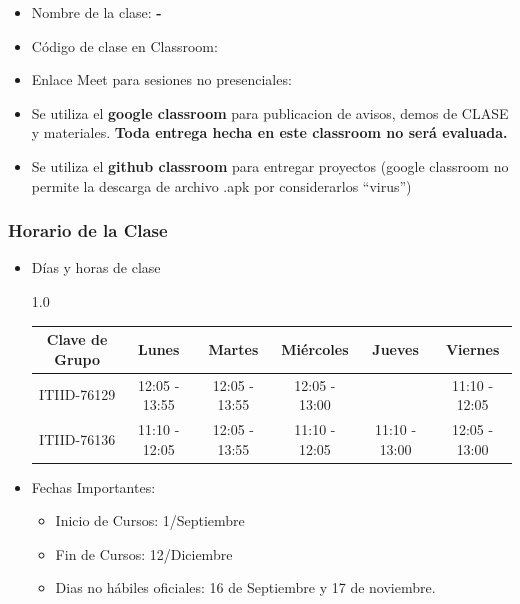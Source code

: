


\begin{frame}
\begin{itemize}
\frametitle{Plataforma Virtual para el Curso}
\item Nombre de la clase: \textbf{\nombreMateria-\cuatrimestre}
\item Código de clase en Classroom: \textbf{\claveClassroom}
\item Enlace Meet para sesiones no presenciales: \textbf{\claveMeet}
\item Se utiliza el \textbf{google classroom} para publicacion de avisos, demos de CLASE y materiales. \textbf{Toda entrega hecha en este classroom no será evaluada.}
\item Se utiliza el \textbf{github classroom} para entregar proyectos (google classroom no permite la descarga de archivo .apk por considerarlos ``virus'')
\end{itemize}
\end{frame}



\begin{frame}
\frametitle{Horario de la Clase}


\begin{itemize}
\item Días y horas de clase
\tiny
\begin{spacing}{1.0}
\begin{center}
\begin{tabular}{c|ccccc}
\hline 
\textbf{Clave de Grupo}   & Lunes          & Martes        & Miércoles     & Jueves        & Viernes          \\ \hline 
ITIID-76129                & 12:05 - 13:55 & 12:05 - 13:55 & 12:05 - 13:00 &               & 11:10 - 12:05    \\ \hline
ITIID-76136                & 11:10 - 12:05 & 12:05 - 13:55 & 11:10 - 12:05  & 11:10 - 13:00 & 12:05 - 13:00      \\ \hline                    
\hline
\end{tabular}
\end{center}
\end{spacing}
\normalsize
\item Fechas Importantes:
\begin{itemize}
\item Inicio de Cursos: 1/Septiembre
\item Fin de Cursos: 12/Diciembre
\item Dias no hábiles oficiales: 16 de Septiembre y 17 de noviembre.
\end{itemize}
\end{itemize}

\end{frame}


